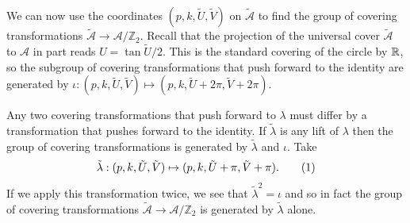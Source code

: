 \documentclass{article}
\begin{document}

We can now use the coordinates $(p,k,\tilde{U},\tilde{V})$ on $\mathcal{\tilde{A}}$ to find the group of covering transformations $\mathcal{\tilde{A}} \to \mathcal{A}/\mathbb{Z}_2$.
Recall that the projection of the universal cover $\mathcal{\tilde{A}}$ to $\mathcal{A}$ in part reads $U = \tan \tilde{U}/2$. This is the standard covering of the circle by $\mathbb{R}$, so the subgroup of covering transformations that push forward to the identity are generated by
$\iota: (p,k,\tilde{U},\tilde{V}) \mapsto (p,k,\tilde{U} + 2\pi ,\tilde{V} +2\pi)$.

Any two covering transformations that push forward to $\lambda$ must differ by a transformation that pushes forward to the identity. If $\tilde{\lambda}$ is any lift of $\lambda$ then the group of covering transformations is generated by $\tilde{\lambda}$ and $\iota$. Take
\[
\tilde{\lambda} : (p,k,\tilde{U},\tilde{V}) \mapsto (p,k, \tilde{U} + \pi, \tilde{V} + \pi).
\labelthis{eqn:tilde lambda action}
\]
If we apply this transformation twice, we see that $\tilde{\lambda}^2 = \iota$ and so in fact the group of covering transformations $\mathcal{\tilde{A}} \to \mathcal{A}/\mathbb{Z}_2$ is generated by $\tilde{\lambda}$ alone.
\end{document}
